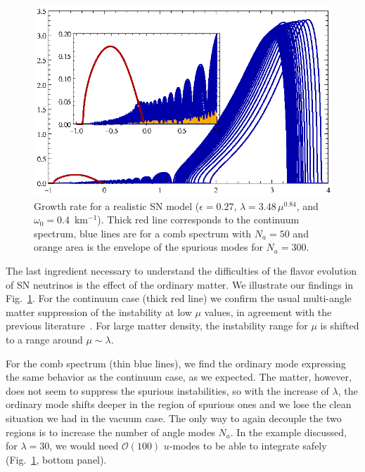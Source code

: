 \documentclass[twocolumn,prd,showpacs,
floatfix,preprintnumbers,nofootinbib]{revtex4}
\begin{document}
\begin{figure}
\includegraphics[width=0.8\columnwidth]{realistic_discrete.eps}
\caption{
Growth rate for a realistic SN model ($\epsilon = 0.27$, $\lambda = 3.48 \, \mu^{0.84}$, and $\omega_0 = 0.4$~km$^{-1}$). Thick red line corresponds to the continuum spectrum, blue lines are for a comb spectrum with $N_a=50$ and orange area is the envelope of the spurious modes for $N_a=300$.
\label{fig:discrete2}}
\end{figure}

The last ingredient necessary to understand the difficulties of the flavor evolution of SN neutrinos is the effect of the ordinary matter. 
We illustrate our findings in Fig.~\ref{fig:discrete2}.
For the continuum case (thick red line) we confirm the usual
multi-angle matter suppression of the instability at low $\mu$
values, in agreement with the previous
literature~\cite{Banerjee:2011fj, Sarikas:2011am}. For large matter density, the instability range for $\mu$ is
shifted to a range around $\mu\sim\lambda$.

For the comb spectrum (thin blue lines), we find the ordinary mode
expressing the same behavior as the continuum case, as we expected.
The matter, however, does not seem to suppress the spurious instabilities, so with the increase of $\lambda$, the ordinary mode shifts deeper in the region of spurious ones and we lose the clean situation we had in the vacuum case. The only way to again decouple the two regions is to increase the number of angle modes $N_a$. In the example discussed, for $\lambda=30$, we would need $\mathcal{O}(100)$ $u$-modes to be able to integrate safely (Fig.~\ref{fig:discrete2}, bottom panel).
\end{document}
